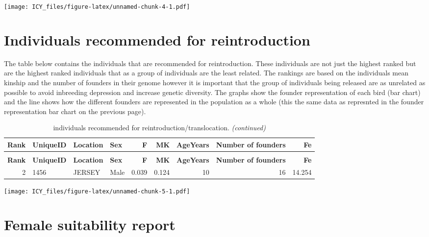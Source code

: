 \documentclass[12pt,]{article}
\begin{document}
\texttt{[image: ICY\_files/figure-latex/unnamed-chunk-4-1.pdf]}

\newpage

\hypertarget{best_ind}{\section{\textbf{Individuals recommended for reintroduction}}}

The table below contains the individuals that are recommended for
reintroduction. These individuals are not just the highest ranked but
are the highest ranked individuals that as a group of individuals are
the least related. The rankings are based on the individuals mean
kinship and the number of founders in their genome however it is
important that the group of individuals being released are as unrelated
as possible to avoid inbreeding depression and increase genetic
diversity. The graphs show the founder representation of each bird (bar
chart) and the line shows how the different founders are represented in
the population as a whole (this the same data as represnted in the
founder representation bar chart on the previous page).

\begin{longtable}{rlllrrrrr}
\caption{\label{tab:unnamed-chunk-5}individuals recommended for reintroduction/translocation.}\\
\toprule
\textbf{Rank} & \textbf{UniqueID} & \textbf{Location} & \textbf{Sex} & \textbf{F} & \textbf{MK} & \textbf{AgeYears} & \textbf{Number of founders} & \textbf{Fe}\\
\midrule
\endfirsthead
\caption[]{individuals recommended for reintroduction/translocation. \textit{(continued)}}\\
\toprule
\textbf{Rank} & \textbf{UniqueID} & \textbf{Location} & \textbf{Sex} & \textbf{F} & \textbf{MK} & \textbf{AgeYears} & \textbf{Number of founders} & \textbf{Fe}\\
\midrule
\endhead
\
\endfoot
\bottomrule
\endlastfoot
\rowcolor{gray!6}  2 & 1456 & JERSEY & Male & 0.039 & 0.124 & 10 & 16 & 14.254\\*
\end{longtable}

\texttt{[image: ICY\_files/figure-latex/unnamed-chunk-5-1.pdf]}

\newpage

\hypertarget{fem_rep}{\section{\textbf{Female suitability report}}}
\end{document}

